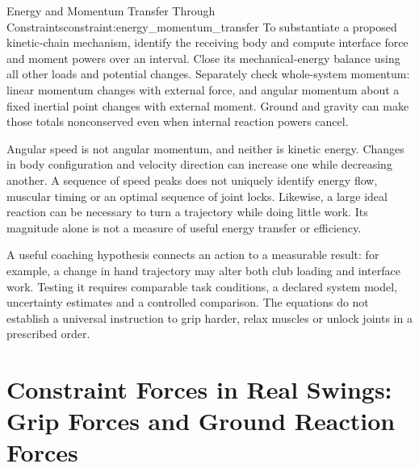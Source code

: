 \begin{constraintbox}{Energy and Momentum Transfer Through Constraints}{constraint:energy_momentum_transfer}
To substantiate a proposed kinetic-chain mechanism, identify the receiving body and compute interface force and moment powers over an interval. Close its mechanical-energy balance using all other loads and potential changes. Separately check whole-system momentum: linear momentum changes with external force, and angular momentum about a fixed inertial point changes with external moment. Ground and gravity can make those totals nonconserved even when internal reaction powers cancel.

Angular speed is not angular momentum, and neither is kinetic energy. Changes in body configuration and velocity direction can increase one while decreasing another. A sequence of speed peaks does not uniquely identify energy flow, muscular timing or an optimal sequence of joint locks. Likewise, a large ideal reaction can be necessary to turn a trajectory while doing little work. Its magnitude alone is not a measure of useful energy transfer or efficiency.

A useful coaching hypothesis connects an action to a measurable result: for example, a change in hand trajectory may alter both club loading and interface work. Testing it requires comparable task conditions, a declared system model, uncertainty estimates and a controlled comparison. The equations do not establish a universal instruction to grip harder, relax muscles or unlock joints in a prescribed order.
\end{constraintbox}

\section{Constraint Forces in Real Swings: Grip Forces and Ground Reaction Forces}
\label{sec:constraint_forces_real_swing}

